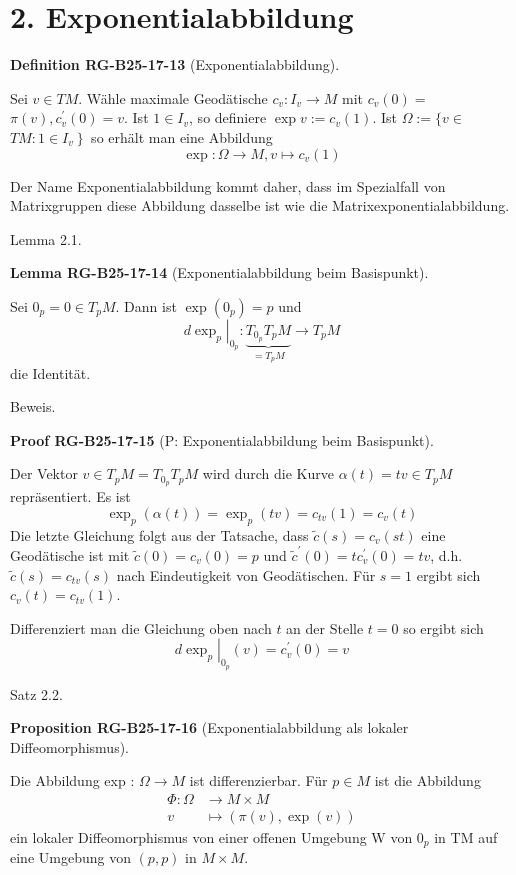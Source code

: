 \documentclass[10pt, letterpaper]{article}
\newcommand{\CustomHeading}[3]{%
  \par\medskip\noindent%
  \textbf{#1 #2} \textnormal{(#3)}.\enskip%
}
\newenvironment{DEF}[2]{\begin{unitbox}\CustomHeading{Definition}{#1}{#2}}{\end{unitbox}}
\newenvironment{PROP}[2]{\begin{unitbox}\CustomHeading{Proposition}{#1}{#2}}{\end{unitbox}}
\newenvironment{LEM}[2]{\begin{unitbox}\CustomHeading{Lemma}{#1}{#2}}{\end{unitbox}}
\newenvironment{PROOF}[2]{\begin{unitbox}\CustomHeading{Proof}{#1}{#2}}{\end{unitbox}}
\begin{document}
\section*{2. Exponentialabbildung}


\begin{DEF}{RG-B25-17-13}{Exponentialabbildung}
Sei $v \in T M$. Wähle maximale Geodätische $c_{v}: I_{v} \rightarrow M$ mit $c_{v}(0)=$ $\pi(v), c_{v}^{\prime}(0)=v$. Ist $1 \in I_{v}$, so definiere $\exp v:=c_{v}(1)$. Ist $\Omega:=\{v \in$ $\left.T M: 1 \in I_{v}\right\}$ so erhält man eine Abbildung 
$$\exp : \Omega \rightarrow M, v \mapsto c_{v}(1)$$
\end{DEF}


Der Name Exponentialabbildung kommt daher, dass im Spezialfall von Matrixgruppen diese Abbildung dasselbe ist wie die Matrixexponentialabbildung.

Lemma 2.1. 


\begin{LEM}{RG-B25-17-14}{Exponentialabbildung beim Basispunkt}
Sei $0_{p}=0 \in T_{p} M$. Dann ist $\exp \left(0_{p}\right)=p$ und
$$
\left.d \exp _{p}\right|_{0_{p}}: \underbrace{T_{0_{p}} T_{p} M}_{=T_{p} M} \rightarrow T_{p} M
$$
die Identität.
\end{LEM}


Beweis. 


\begin{PROOF}{RG-B25-17-15}{P: Exponentialabbildung beim Basispunkt}
Der Vektor $v \in T_{p} M=T_{0_{p}} T_{p} M$ wird durch die Kurve $\alpha(t)=t v \in T_{p} M$ repräsentiert. Es ist
$$
\exp _{p}(\alpha(t))=\exp _{p}(t v)=c_{t v}(1)=c_{v}(t)
$$
Die letzte Gleichung folgt aus der Tatsache, dass $\tilde{c}(s)=c_{v}(s t)$ eine Geodätische ist mit $\tilde{c}(0)=c_{v}(0)=p$ und $\tilde{c}^{\prime}(0)=t c_{v}^{\prime}(0)=t v$, d.h. $\tilde{c}(s)=c_{t v}(s)$ nach Eindeutigkeit von Geodätischen. Für $s=1$ ergibt sich $c_{v}(t)=c_{t v}(1)$.

Differenziert man die Gleichung oben nach $t$ an der Stelle $t=0$ so ergibt sich
$$
\left.d \exp _{p}\right|_{0_{p}}(v)=c_{v}^{\prime}(0)=v
$$
\end{PROOF}



Satz 2.2. 


\begin{PROP}{RG-B25-17-16}{Exponentialabbildung als lokaler Diffeomorphismus}
Die Abbildung exp : $\Omega \rightarrow M$ ist differenzierbar. Für $p \in M$ ist die Abbildung
$$
\begin{aligned}
\Phi: \Omega & \rightarrow M \times M \\
v & \mapsto(\pi(v), \exp (v))
\end{aligned}
$$
ein lokaler Diffeomorphismus von einer offenen Umgebung W von $0_{p}$ in TM auf eine Umgebung von $(p, p)$ in $M \times M$.
\end{PROP}
\end{document}
